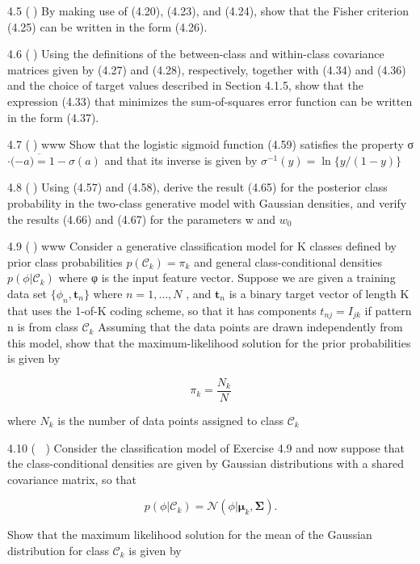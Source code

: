 \documentclass[
  10
]{article}
\begin{document}
4.5 () By making use of (4.20), (4.23), and (4.24), show that the Fisher
criterion (4.25) can be written in the form (4.26).

4.6 () Using the definitions of the between-class and within-class
covariance matrices given by (4.27) and (4.28), respectively, together
with (4.34) and (4.36) and the choice of target values described in
Section 4.1.5, show that the expression (4.33) that minimizes the
sum-of-squares error function can be written in the form (4.37).

4.7 () www Show that the logistic sigmoid function (4.59) satisfies the
property σ \(\cdot ( - { \overline { { a ) = 1 } } } - \sigma ( a )\)
and that its inverse is given by
\(\sigma ^ { - 1 } ( y ) = \ln { \{ y / ( 1 - y ) \} }\)

4.8 () Using (4.57) and (4.58), derive the result (4.65) for the
posterior class probability in the two-class generative model with
Gaussian densities, and verify the results (4.66) and (4.67) for the
parameters w and \(w _ { 0 }\)

4.9 () www Consider a generative classification model for K classes
defined by prior class probabilities
\(p ( \mathcal { C } _ { k } ) = \pi _ { k }\) and general
class-conditional densities \(p ( \phi | { \mathcal C } _ { k } )\)
where φ is the input feature vector. Suppose we are given a training
data set \(\{ \phi _ { n } , \mathbf { t } _ { n } \}\) where
\(n = 1 , \ldots , N\) , and \(\mathbf { t } _ { n }\) is a binary
target vector of length K that uses the 1-of-K coding scheme, so that it
has components \(t _ { n j } = I _ { j k }\) if pattern n is from class
\(\mathcal { C } _ { k }\) Assuming that the data points are drawn
independently from this model, show that the maximum-likelihood solution
for the prior probabilities is given by

\[
\pi_ {k} = \frac {N _ {k}}{N}\tag{4.159}
\]

where \(N _ { k }\) is the number of data points assigned to class
\(\mathcal { C } _ { k }\)

4.10 ( ) Consider the classification model of Exercise 4.9 and now
suppose that the class-conditional densities are given by Gaussian
distributions with a shared covariance matrix, so that

\[
p (\phi | \mathcal {C} _ {k}) = \mathcal {N} (\phi | \boldsymbol {\mu} _ {k}, \boldsymbol {\Sigma}).\tag{4.160}
\]

Show that the maximum likelihood solution for the mean of the Gaussian
distribution for class \(\mathcal { C } _ { k }\) is given by
\end{document}
